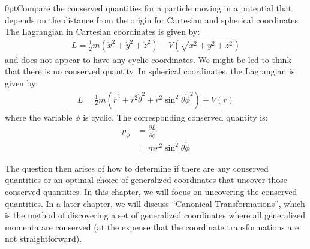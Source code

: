 \begin{example}{0pt}{Compare the conserved quantities for a particle moving in a potential that depends on the distance from the origin for Cartesian and spherical coordinates}{}
The Lagrangian in Cartesian coordinates is given by:
\begin{align*}
L=\frac{1}{2}m(\dot{x}^2+\dot{y}^2+\dot{z}^2)-V\left(\sqrt{x^2+y^2+z^2}\right)
\end{align*}
and does not appear to have any cyclic coordinates. We might be led to think that there is no conserved quantity.
In spherical coordinates, the Lagrangian is given by:
\begin{align*}
L=\frac{1}{2}m(\dot{r}^2+r^2\dot{\theta}^2+r^2\sin^2{\theta}\dot{\phi}^2)-V(r)
\end{align*}
where the variable $\phi$ is cyclic. The corresponding conserved quantity is:
\begin{align*}
p_\phi &=\frac{\partial L}{\partial \dot{\phi}}\\
&=mr^2\sin^2\theta\dot{\phi}
\end{align*}
\end{example}

The question then arises of how to determine if there are any conserved quantities or an optimal choice of generalized coordinates that uncover those conserved quantities. In this chapter, we will focus on uncovering the conserved quantities. In a later chapter, we will discuss ``Canonical Transformations'', which is the method of discovering a set of generalized coordinates where all generalized momenta are conserved (at the expense that the coordinate transformations are not straightforward).

